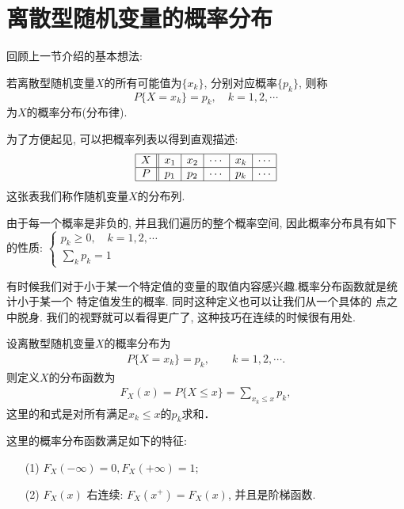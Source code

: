 \section{离散型随机变量的概率分布}
回顾上一节介绍的基本想法: 
\begin{definition}[概率分布]
    若离散型随机变量$X$的所有可能值为$\{x_k\}$, 分别对应概率$\{p_k\}$, 则称
    $$P\{X=x_k\}=p_k, \quad k=1,2,\cdots$$
    为$X$的概率分布(分布律).
\end{definition}

为了方便起见, 可以把概率列表以得到直观描述:
\[\begin{array}{|c||c|c|c|c|c|}\hline
        X & x_1 & x_2 & \cdots & x_k & \cdots \\ \hline
        P & p_1 & p_2 & \cdots & p_k & \cdots \\ \hline
    \end{array}\]
这张表我们称作随机变量$X$的分布列.

由于每一个概率是非负的, 并且我们遍历的整个概率空间, 因此概率分布具有如下的性质:
$\displaystyle \left\{ \begin{array}{l} p_k\ge 0, \quad k=1,2,\cdots \\
        \sum\limits_{k}{p_k}=1\end{array} \right.$

有时候我们对于小于某一个特定值的变量的取值内容感兴趣.概率分布函数就是统计小于某一个
特定值发生的概率.
同时这种定义也可以让我们从一个具体的
点之中脱身. 我们的视野就可以看得更广了, 这种技巧在连续的时候很有用处.

\begin{definition}[概率分布函数]
    设离散型随机变量$X$的概率分布为
    \begin{align*}
        P\{X=x_k\}=p_k,\qquad k=1,2,\cdots.
    \end{align*}
    则定义$X$的分布函数为
    \begin{align*}
        F_X(x)=P\{X\le x\}=\sum_{x_k\le x} p_k,
    \end{align*}
    这里的和式是对所有满足$x_k\le x$的$p_k$求和．
\end{definition}

这里的概率分布函数满足如下的特征: 
\begin{itemize}
    \item [(1)] $F_{X}(-\infty)=0, F_{X}(+\infty)=1$;
    \item [(2)] $F_{X}(x)$ 右连续: $F_{X}(x^+)=F_{X}(x)$, 并且是阶梯函数.
\end{itemize}


